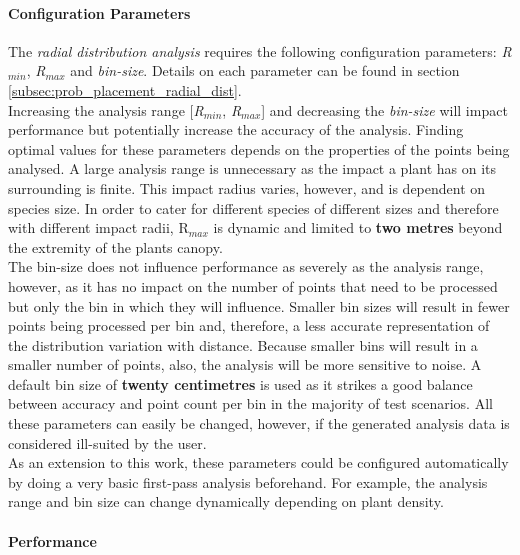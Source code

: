 \paragraph{Configuration Parameters}

The \textit{radial distribution analysis} requires the following configuration parameters: \textit{R$_{min}$}, \textit{R$_{max}$} and \textit{bin-size}. Details on each parameter can be found in section \ref{subsec:prob_placement_radial_dist}.\\

Increasing the analysis range [\textit{R$_{min}$}, \textit{R$_{max}$}] and decreasing the \textit{bin-size} will impact performance but potentially increase the accuracy of the analysis. Finding optimal values for these parameters depends on the properties of the points being analysed. A large analysis range is unnecessary as the impact a plant has on its surrounding is finite. This impact radius varies, however, and is dependent on species size. In order to cater for different species of different sizes and therefore with different impact radii, R$_{max}$ is dynamic and limited to \textbf{two metres} beyond the extremity of the plants canopy. \\
The bin-size does not influence performance as severely as the analysis range, however, as it has no impact on the number of points that need to be processed but only the bin in which they will influence. Smaller bin sizes will result in fewer points being processed per bin and, therefore, a less accurate representation of the distribution variation with distance. Because smaller bins will result in a smaller number of points, also, the analysis will be more sensitive to noise. A default bin size of \textbf{twenty centimetres} is used as it strikes a good balance between accuracy and point count per bin in the majority of test scenarios. All these parameters can easily be changed, however, if the generated analysis data is considered ill-suited by the user. \\

As an extension to this work, these parameters could be configured automatically by doing a very basic first-pass analysis beforehand. For example, the analysis range and bin size can change dynamically depending on plant density. \\

\paragraph{Performance}

